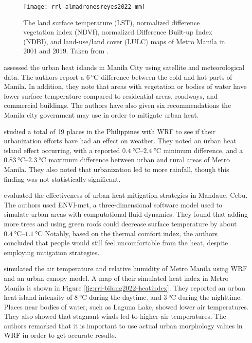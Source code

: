 		\begin{figure}
			\centering
			\texttt{[image: rrl-almadronesreyes2022-mm]}
			\caption{
				The land surface temperature (LST),
				normalized difference vegetation index (NDVI), 
				normalized Difference Built-up Index (NDBI),
				and land-use/land cover (LULC)
				maps of Metro Manila in 2001 and 2019.
				Taken from \textcite{AlmadronesReyes2022}.
			}
			\label{fig:rrl-almadronesreyes2022-mm}
		\end{figure}
		
		\textcite{Purio2022} assessed the urban heat islands in Manila City using satellite and meteorological data.
		The authors report a $\qty{6}{\degreeCelsius}$ difference between the cold and hot parts of Manila.
		In addition, they note that areas with vegetation or bodies of water have lower surface temperature compared to residential areas, roadways, and commercial buildings.
		The authors have also given six recommendations the Manila city government may use in order to mitigate urban heat.
		
		\textcite{Oliveros2019} studied a total of 19 places in the Philippines with WRF to see if their urbanization efforts have had an effect on weather.
		They noted an urban heat island effect occurring, with a reported
			$\qtyrange{0.4}{2.4}{\degreeCelsius}$ minimum difference, and a 
			$\qtyrange{0.83}{2.3}{\degreeCelsius}$ maximum difference
			between urban and rural areas of Metro Manila.
		They also noted that urbanization led to more rainfall, though this finding was not statistically significant.
		
		\textcite{Cortes2022} evaluated the effectiveness of urban heat mitigation strategies in Mandaue, Cebu.
		The authors used ENVI-met, a three-dimensional software model used to simulate urban areas with computational fluid dynamics.
		They found that adding more trees and using green roofs could decrease surface temperature by about $\qtyrange{0.4}{1.1}{\degreeCelsius}$
		Notably, based on the thermal comfort index, the authors concluded that people would still feel uncomfortable from the heat, despite employing mitigation strategies.
		
		\textcite{Bilang2022} simulated the air temperature and relative humidity of Metro Manila using WRF and an urban canopy model.
		A map of their simulated heat index in Metro Manila is shown in Figure \ref{fig:rrl-bilang2022-heatindex}.
		They reported an urban heat island intensity of $\qty{8}{\degreeCelsius}$ during the daytime, and
			$\qty{3}{\degreeCelsius}$ during the nighttime.
		Places near bodies of water, such as Laguna Lake, showed lower air temperatures.
		They also showed that stagnant winds led to higher air temperatures.
		The authors remarked that it is important to use actual urban morphology values in WRF in order to get accurate results.
		

